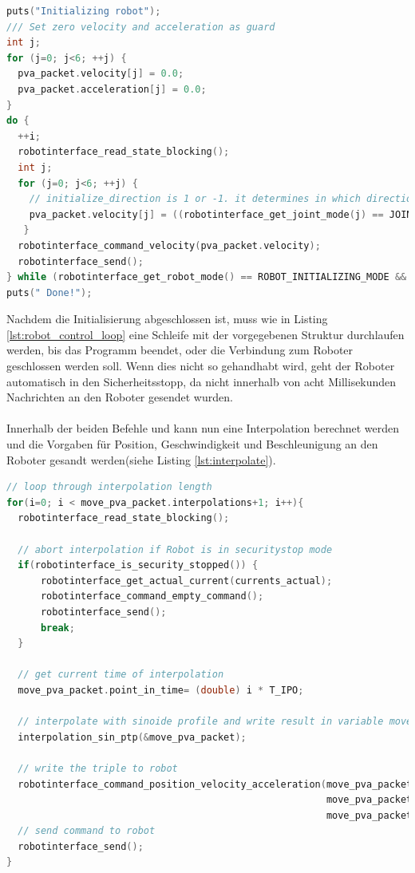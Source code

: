 \begin{lstlisting}[language=C,caption={Initialisierung der einzelnen Gelenke}, label=lst:initialize_robot_lst,captionpos=b]
puts("Initializing robot");
/// Set zero velocity and acceleration as guard
int j;
for (j=0; j<6; ++j) {
  pva_packet.velocity[j] = 0.0;
  pva_packet.acceleration[j] = 0.0;
}
do {
  ++i;
  robotinterface_read_state_blocking();
  int j;
  for (j=0; j<6; ++j) {
    // initialize_direction is 1 or -1. it determines in which direction die Joint is moving during the initialization
    pva_packet.velocity[j] = ((robotinterface_get_joint_mode(j) == JOINT_INITIALISATION_MODE)) ? (initialize_direction)* 0.1 : 0.0;
   }
  robotinterface_command_velocity(pva_packet.velocity);
  robotinterface_send();
} while (robotinterface_get_robot_mode() == ROBOT_INITIALIZING_MODE && exit_flag == false);
puts(" Done!");
\end{lstlisting}

Nachdem die Initialisierung abgeschlossen ist, muss wie in Listing \ref{lst:robot_control_loop} eine Schleife mit der vorgegebenen Struktur durchlaufen werden, bis das Programm beendet, oder die Verbindung zum Roboter geschlossen werden soll. Wenn dies nicht so gehandhabt wird, geht der Roboter automatisch in den Sicherheitsstopp, da nicht innerhalb von acht Millisekunden Nachrichten an den Roboter gesendet wurden.
\\\\
Innerhalb der beiden Befehle  und  kann nun eine Interpolation berechnet werden und die Vorgaben für Position, Geschwindigkeit und Beschleunigung an den Roboter gesandt werden(siehe Listing \ref{lst:interpolate}).

\begin{lstlisting}[language=C,caption={Interpolation eines Berechneten Weges}, label=lst:interpolate,captionpos=b]
// loop through interpolation length  
for(i=0; i < move_pva_packet.interpolations+1; i++){
  robotinterface_read_state_blocking();

  // abort interpolation if Robot is in securitystop mode
  if(robotinterface_is_security_stopped()) {
      robotinterface_get_actual_current(currents_actual);
      robotinterface_command_empty_command();
      robotinterface_send();
      break;
  }

  // get current time of interpolation 
  move_pva_packet.point_in_time= (double) i * T_IPO;

  // interpolate with sinoide profile and write result in variable move_pva_packet
  interpolation_sin_ptp(&move_pva_packet);

  // write the triple to robot
  robotinterface_command_position_velocity_acceleration(move_pva_packet.pva.position,
                                                        move_pva_packet.pva.velocity,
                                                        move_pva_packet.pva.acceleration);
  // send command to robot
  robotinterface_send();
}
\end{lstlisting}

